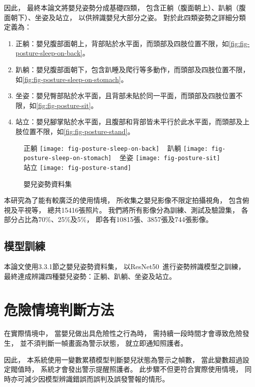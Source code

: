 \documentclass[class=NCU_thesis, crop=false]{standalone}
\begin{document}
因此，
最終本論文將嬰兒姿勢分成基礎四類，
包含正躺（腹面朝上）、趴躺（腹面朝下）、坐姿及站立，
以供辨識嬰兒大部分之姿。
對於此四類姿勢之詳細分類定義為：
\begin{enumerate}
    \item 正躺：嬰兒腹部面朝上，背部貼於水平面，而頭部及四肢位置不限，如\cref{fig:fig-posture-sleep-on-back}。
    \item 趴躺：嬰兒腹部面朝下，包含趴睡及爬行等多動作，而頭部及四肢位置不限，如\cref{fig:fig-posture-sleep-on-stomach}。
    \item 坐姿：嬰兒臀部貼於水平面，且背部未貼於同一平面，而頭部及四肢位置不限，如\cref{fig:fig-posture-sit}。
    \item 站立：嬰兒腳掌貼於水平面，且腹部和背部皆未平行於此水平面，而頭部及上肢位置不限，如\cref{fig:fig-posture-stand}。
\end{enumerate}
\begin{figure}[!hbt]
    \centering
    \subcaptionbox
        {正躺
        \label{fig:fig-posture-sleep-on-back}}
        {\texttt{[image: fig-posture-sleep-on-back]}}
    ~
    \subcaptionbox
        {趴躺
        \label{fig:fig-posture-sleep-on-stomach}}
        {\texttt{[image: fig-posture-sleep-on-stomach]}}
    ~
    \subcaptionbox
        {坐姿
        \label{fig:fig-posture-sit}}
        {\texttt{[image: fig-posture-sit]}}
    ~
    \subcaptionbox
        {站立
        \label{fig:fig-posture-stand}}
        {\texttt{[image: fig-posture-stand]}}
    \caption{嬰兒姿勢資料集}
    \label{fig:fig-face-dataset}
\end{figure}

本研究為了能有較廣泛的使用情境，
所收集之嬰兒影像不限定拍攝視角，
包含俯視及平視等，
總共15416張照片。
我們將所有影像分為訓練、測試及驗證集，
各部分占比為70\%、25\%及5\%，
即各有10815張、3857張及744張影像。

\subsection{模型訓練}
本論文使用3.3.1節之嬰兒姿勢資料集，
以ResNet50~\cite{he_deep_2016}進行姿勢辨識模型之訓練，
最終達成辨識四種嬰兒姿勢：正躺、趴躺、坐姿及站立。

\section{危險情境判斷方法}
在實際情境中，
當嬰兒做出具危險性之行為時，
需持續一段時間才會導致危險發生，
並不須判斷一幀畫面為警示狀態，
就立即通知照護者。

因此，
本系統使用一變數累積模型判斷嬰兒狀態為警示之幀數，
當此變數超過設定閥值時，
系統才會發出警示提醒照護者。
此步驟不但更符合實際使用情境，
同時亦可減少因模型辨識錯誤而誤判及誤發警報的情形。
\end{document}
